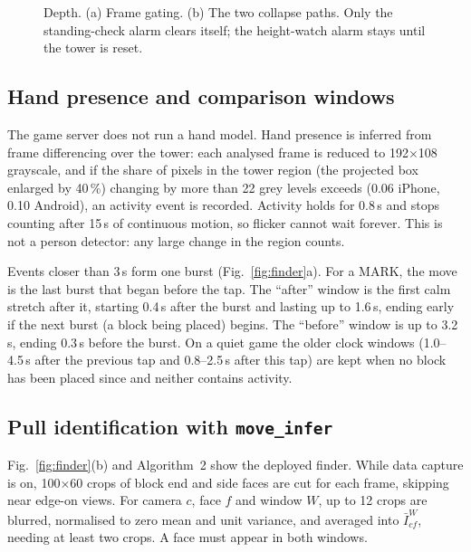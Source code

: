 \documentclass[conference,10pt]{IEEEtran}
\newcommand{\code}[1]{\texttt{\small\detokenize{#1}}}
\begin{document}
\begin{figure}[!t]
\caption{Depth. (a) Frame gating. (b) The two collapse paths. Only the standing-check alarm clears itself; the height-watch alarm stays until the tower is reset.}\label{fig:depth}
\end{figure}

\subsection{Hand presence and comparison windows}\label{sec:hand}
The game server does not run a hand model. Hand presence is inferred from frame differencing over the tower: each analysed frame is reduced to 192$\times$108 grayscale, and if the share of pixels in the tower region (the projected box enlarged by 40\,\%) changing by more than 22 grey levels exceeds \code{MOTION_FRAC} (0.06 iPhone, 0.10 Android), an activity event is recorded. Activity holds for 0.8\,s and stops counting after 15\,s of continuous motion, so flicker cannot wait forever. This is not a person detector: any large change in the region counts.

Events closer than 3\,s form one burst (Fig.~\ref{fig:finder}a). For a MARK, the move is the last burst that began before the tap. The ``after'' window is the first calm stretch after it, starting 0.4\,s after the burst and lasting up to 1.6\,s, ending early if the next burst (a block being placed) begins. The ``before'' window is up to 3.2\,s, ending 0.3\,s before the burst. On a quiet game the older clock windows (1.0--4.5\,s after the previous tap and 0.8--2.5\,s after this tap) are kept when no block has been placed since and neither contains activity.

\subsection{Pull identification with \texttt{move\_infer}}\label{sec:finder}
Fig.~\ref{fig:finder}(b) and Algorithm~2 show the deployed finder. While data capture is on, 100$\times$60 crops of block end and side faces are cut for each frame, skipping near edge-on views. For camera $c$, face $f$ and window $W$, up to 12 crops are blurred, normalised to zero mean and unit variance, and averaged into $\bar I^W_{cf}$, needing at least two crops. A face must appear in both windows.
\end{document}
